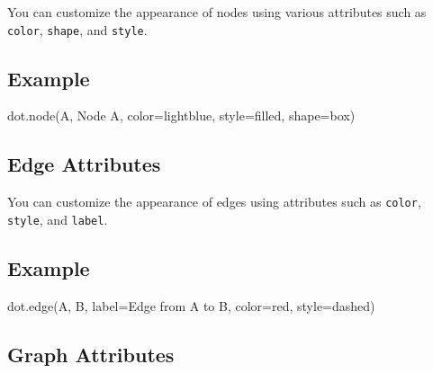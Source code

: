 \documentclass[
  letterpaper,
  DIV=11,
  numbers=noendperiod]{scrreprt}
\newenvironment{Shaded}{\begin{snugshade}}{\end{snugshade}}
\newcommand{\NormalTok}[1]{\textcolor[rgb]{0.00,0.23,0.31}{#1}}
\newcommand{\OperatorTok}[1]{\textcolor[rgb]{0.37,0.37,0.37}{#1}}
\newcommand{\StringTok}[1]{\textcolor[rgb]{0.13,0.47,0.30}{#1}}
\begin{document}
You can customize the appearance of nodes using various attributes such
as \texttt{color}, \texttt{shape}, and \texttt{style}.

\subsection{Example}\label{example-44}

\begin{Shaded}
\begin{Highlighting}[]
\NormalTok{dot.node(}\StringTok{\textquotesingle{}A\textquotesingle{}}\NormalTok{, }\StringTok{\textquotesingle{}Node A\textquotesingle{}}\NormalTok{, color}\OperatorTok{=}\StringTok{\textquotesingle{}lightblue\textquotesingle{}}\NormalTok{, style}\OperatorTok{=}\StringTok{\textquotesingle{}filled\textquotesingle{}}\NormalTok{, shape}\OperatorTok{=}\StringTok{\textquotesingle{}box\textquotesingle{}}\NormalTok{)}
\end{Highlighting}
\end{Shaded}

\subsection{Edge Attributes}\label{edge-attributes}

You can customize the appearance of edges using attributes such as
\texttt{color}, \texttt{style}, and \texttt{label}.

\subsection{Example}\label{example-45}

\begin{Shaded}
\begin{Highlighting}[]
\NormalTok{dot.edge(}\StringTok{\textquotesingle{}A\textquotesingle{}}\NormalTok{, }\StringTok{\textquotesingle{}B\textquotesingle{}}\NormalTok{, label}\OperatorTok{=}\StringTok{\textquotesingle{}Edge from A to B\textquotesingle{}}\NormalTok{, color}\OperatorTok{=}\StringTok{\textquotesingle{}red\textquotesingle{}}\NormalTok{, style}\OperatorTok{=}\StringTok{\textquotesingle{}dashed\textquotesingle{}}\NormalTok{)}
\end{Highlighting}
\end{Shaded}

\subsection{Graph Attributes}\label{graph-attributes}
\end{document}
